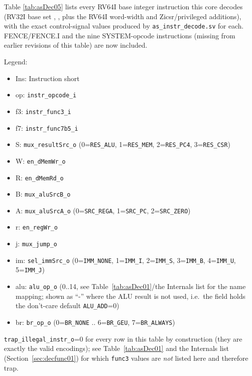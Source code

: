 
Table \ref{tab:asDec05} lists every RV64I base integer instruction this core decodes (RV32I base set \cite{riscvisa01}, \cite{riscvisa02}, \cite{riscvisa03} plus the RV64I word-width and Zicsr/privileged additions), with the exact control-signal values produced by \texttt{as\_instr\_decode.sv} for each. FENCE/FENCE.I and the nine SYSTEM-opcode instructions (missing from earlier revisions of this table) are now included.

Legend:
\begin{itemize}
  \item Ins: Instruction short
  \item op: \texttt{instr\_opcode\_i}
  \item f3: \texttt{instr\_func3\_i}
  \item f7: \texttt{instr\_func7b5\_i}
  \item S: \texttt{mux\_resultSrc\_o} (0=\texttt{RES\_ALU}, 1=\texttt{RES\_MEM}, 2=\texttt{RES\_PC4}, 3=\texttt{RES\_CSR})
  \item W: \texttt{en\_dMemWr\_o}
  \item R: \texttt{en\_dMemRd\_o}
  \item B: \texttt{mux\_aluSrcB\_o}
  \item A: \texttt{mux\_aluSrcA\_o} (0=\texttt{SRC\_REGA}, 1=\texttt{SRC\_PC}, 2=\texttt{SRC\_ZERO})
  \item r: \texttt{en\_regWr\_o}
  \item j: \texttt{mux\_jump\_o}
  \item im: \texttt{sel\_immSrc\_o} (0=\texttt{IMM\_NONE}, 1=\texttt{IMM\_I}, 2=\texttt{IMM\_S}, 3=\texttt{IMM\_B}, 4=\texttt{IMM\_U}, 5=\texttt{IMM\_J})
  \item alu: \texttt{alu\_op\_o} (0..14, see Table~\ref{tab:asDec01}/the Internals list for the name mapping; shown as ``-'' where the ALU result is not used, i.e.\ the field holds the don't-care default \texttt{ALU\_ADD}=0)
  \item br: \texttt{br\_op\_o} (0=\texttt{BR\_NONE} .. 6=\texttt{BR\_GEU}, 7=\texttt{BR\_ALWAYS})
\end{itemize}
\texttt{trap\_illegal\_instr\_o}=0 for every row in this table by construction (they are exactly the valid encodings); see Table~\ref{tab:asDec01} and the Internals list (Section~\ref{sec:decfunc01}) for which \texttt{func3} values are \emph{not} listed here and therefore trap.

